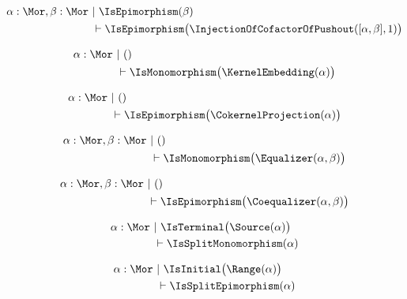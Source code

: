 \begin{sequent}
\begin{align*}
  \alpha:\Mor, \beta:\Mor  ~&|~ \IsEpimorphism( \beta ) \\
  &\vdash \IsEpimorphism\big( \InjectionOfCofactorOfPushout( [\alpha, \beta], 1 ) \big)
\end{align*}
\end{sequent}

\begin{sequent}
\begin{align*}
  \alpha:\Mor ~&|~ () \\
  &\vdash \IsMonomorphism\big( \KernelEmbedding( \alpha ) \big)
\end{align*}
\end{sequent}

\begin{sequent}
\begin{align*}
  \alpha:\Mor ~&|~ () \\
  &\vdash \IsEpimorphism\big( \CokernelProjection( \alpha ) \big)
\end{align*}
\end{sequent}

\begin{sequent}
\begin{align*}
  \alpha:\Mor, \beta:\Mor  ~&|~ () \\
  &\vdash \IsMonomorphism\big( \Equalizer( \alpha, \beta ) \big)
\end{align*}
\end{sequent}

\begin{sequent}
\begin{align*}
  \alpha:\Mor, \beta:\Mor  ~&|~ () \\
  &\vdash \IsEpimorphism\big( \Coequalizer( \alpha, \beta ) \big)
\end{align*}
\end{sequent}

\begin{sequent}\label{sequent:no_proper_context_7}
\begin{align*}
  \alpha:\Mor ~&|~ \IsTerminal\big( \Source( \alpha ) \big)\\
  &\vdash \IsSplitMonomorphism( \alpha )
\end{align*}
\end{sequent}

\begin{sequent}\label{sequent:no_proper_context_8}
\begin{align*}
  \alpha:\Mor ~&|~ \IsInitial\big( \Range( \alpha ) \big)\\
  &\vdash \IsSplitEpimorphism( \alpha )
\end{align*}
\end{sequent}


